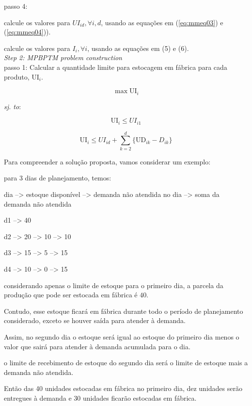 \documentclass[authoryear,preprint,12pt]{elsarticle}
\begin{document}
passo 4: 

calcule os valores para $UI_{id}, \forall i, d$, usando as equações em (\ref{eq:mmeq03}) e (\ref{eq:mmeq04})).

calcule os valores para $I_{i}, \forall i$, usando as equações em (5) e (6). \\

\emph{Step 2: MPBPTM problem construction} \\

passo 1: Calcular a quantidade limite para estocagem em fábrica para cada produto, $\textrm{UI}_{i}$.

\begin{equation}
	\max \textrm{UI}_{i}
\end{equation}

\emph{sj. to}:

\begin{equation}
	\textrm{UI}_{i} \leq UI_{i1}
\end{equation}

\begin{equation}
	\textrm{UI}_{i} \leq UI_{id} + \sum_{k=2}^{d}\{\textrm{UD}_{ik} - D_{ik}\}
\end{equation}

Para compreender a solução proposta, vamos considerar um exemplo:

para 3 dias de planejamento, temos:

dia --> estoque disponível --> demanda não atendida no dia --> soma da demanda não atendida

d1 --> 40

d2 --> 20 --> 10 --> 10

d3 --> 15 --> 5 --> 15

d4 --> 10 --> 0 --> 15

considerando apenas o limite de estoque para o primeiro dia, a parcela da produção que pode ser estocada em fábrica é $40$.

Contudo, esse estoque ficará em fábrica durante todo o período de planejamento considerado, exceto se houver saída para atender à demanda.

Assim, no segundo dia o estoque será igual ao estoque do primeiro dia menos o valor que sairá para atender à demanda acumulada para o dia.

o limite de recebimento de estoque do segundo dia será o limite de estoque mais a demanda não atendida.

Então das 40 unidades estocadas em fábrica no primeiro dia, dez unidades serão entregues à demanda e 30 unidades ficarão estocadas em fábrica.
\end{document}
